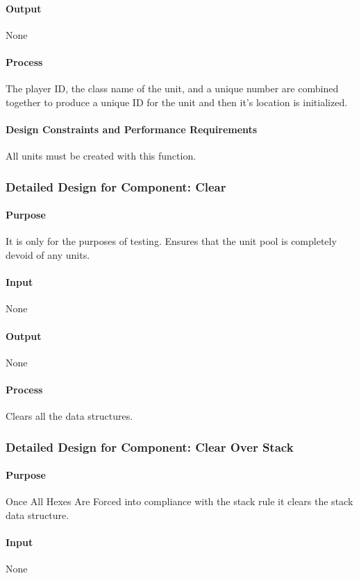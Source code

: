 \documentclass[12pt,a4paper,titlepage]{article}
\begin{document}
\paragraph{Output} None
\paragraph{Process} The player ID, the class name of the unit, and a unique number are combined together to produce a unique ID for the unit and then it's location is initialized.
\paragraph{Design Constraints and Performance Requirements} All units must be created with this function.

\subsubsection{Detailed Design for Component: Clear}
\paragraph{Purpose} It is only for the purposes of testing. Ensures that the unit pool is completely devoid of any units.
\paragraph{Input} None
\paragraph{Output} None
\paragraph{Process} Clears all the data structures.

\subsubsection{Detailed Design for Component: Clear Over Stack}
\paragraph{Purpose} Once All Hexes Are Forced into compliance with the stack rule it clears the stack data structure.
\paragraph{Input} None
\end{document}
